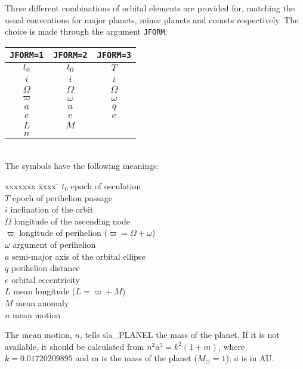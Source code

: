 \documentclass[11pt,twoside]{article}
\begin{document}
Three different combinations of orbital elements are
provided for, matching the usual conventions
for major planets, minor planets and
comets respectively.  The choice is made through the
argument {\tt JFORM}:

\vspace{1ex}
\hspace{3em}
\begin{tabular}{|c|c|c|} \hline
{\tt JFORM=1} & {\tt JFORM=2} & {\tt JFORM=3} \\
\hline \hline
$t_0$ & $t_0$ & $T$ \\
\hline
$i$ & $i$ & $i$ \\
\hline
$\Omega$ & $\Omega$ & $\Omega$ \\
\hline
$\varpi$ & $\omega$ & $\omega$ \\
\hline
$a$ & $a$ & $q$ \\
\hline
$e$ & $e$ & $e$ \\
\hline
$L$ & $M$ & \\
\hline
$n$ & & \\
\hline
\end{tabular}\\[2ex]
The symbols have the following meanings:

\vspace{-1ex}
\begin{tabbing}
xxxxxxx \= xxxx \= \kill
\> $t_0$ \> epoch of osculation \\
\> $T$ \> epoch of perihelion passage \\
\> $i$ \> inclination of the orbit \\
\> $\Omega$ \> longitude of the ascending node \\
\> $\varpi$ \> longitude of perihelion ($\varpi = \Omega + \omega$) \\
\> $\omega$ \> argument of perihelion \\
\> $a$ \> semi-major axis of the orbital ellipse \\
\> $q$ \> perihelion distance \\
\> $e$ \> orbital eccentricity \\
\> $L$ \> mean longitude ($L = \varpi + M$) \\
\> $M$ \> mean anomaly \\
\> $n$ \> mean motion \\
\end{tabbing}

The mean motion, $n$, tells
sla\_PLANEL the mass of the planet.
If it is not available, it should be calculated
from $n^2 a^3 = k^2 (1+m)$, where $k = 0.01720209895$ and
m is the mass of the planet ($M_\odot = 1$); $a$ is in AU.
\end{document}
